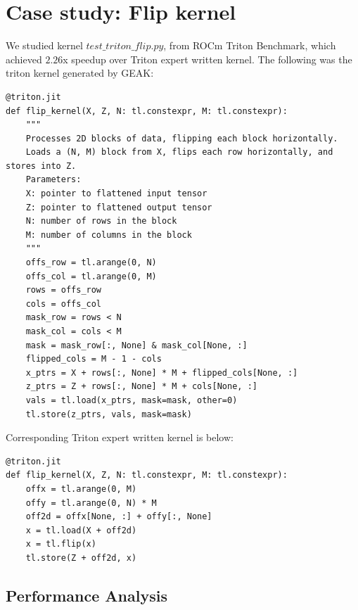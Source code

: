 \documentclass{article}
\begin{document}
  
  

\appendix

\section{Case study: Flip kernel}

\label{appendix:case-study}

We studied kernel $test\_triton\_flip.py$, from ROCm Triton Benchmark, which achieved $2.26$x speedup over Triton expert written kernel. The following was the triton kernel generated by GEAK:

\begin{lstlisting}[style=pythonstyle]
@triton.jit
def flip_kernel(X, Z, N: tl.constexpr, M: tl.constexpr):
    """
    Processes 2D blocks of data, flipping each block horizontally.
    Loads a (N, M) block from X, flips each row horizontally, and stores into Z.
    Parameters:
    X: pointer to flattened input tensor
    Z: pointer to flattened output tensor
    N: number of rows in the block
    M: number of columns in the block
    """
    offs_row = tl.arange(0, N)
    offs_col = tl.arange(0, M)
    rows = offs_row
    cols = offs_col
    mask_row = rows < N
    mask_col = cols < M
    mask = mask_row[:, None] & mask_col[None, :]
    flipped_cols = M - 1 - cols
    x_ptrs = X + rows[:, None] * M + flipped_cols[None, :]
    z_ptrs = Z + rows[:, None] * M + cols[None, :]
    vals = tl.load(x_ptrs, mask=mask, other=0)
    tl.store(z_ptrs, vals, mask=mask)
\end{lstlisting}


Corresponding Triton expert written kernel is below:
\begin{lstlisting}[style=pythonstyle]
@triton.jit
def flip_kernel(X, Z, N: tl.constexpr, M: tl.constexpr):
    offx = tl.arange(0, M)
    offy = tl.arange(0, N) * M
    off2d = offx[None, :] + offy[:, None]
    x = tl.load(X + off2d)
    x = tl.flip(x)
    tl.store(Z + off2d, x)
\end{lstlisting}

\subsection{Performance Analysis}
\end{document}
